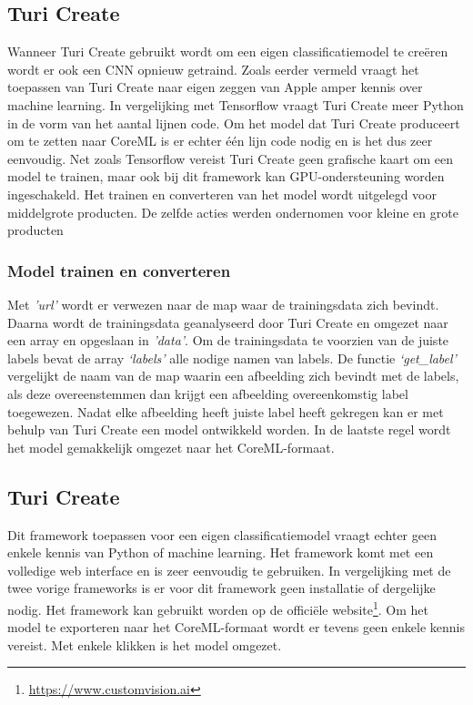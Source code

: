 \subsection{Turi Create}
\label{ssec:Turi Create}

Wanneer Turi Create gebruikt wordt om een eigen classificatiemodel te creëren wordt er ook een \acrshort{CNN} opnieuw getraind. Zoals eerder vermeld vraagt het toepassen van Turi Create naar eigen zeggen van Apple amper kennis over machine learning. In vergelijking met Tensorflow vraagt Turi Create meer Python in de vorm van het aantal lijnen code. Om het model dat Turi Create produceert om te zetten naar CoreML is er echter één lijn code nodig en is het dus zeer eenvoudig. Net zoals Tensorflow vereist Turi Create geen grafische kaart om een model te trainen, maar ook bij dit framework kan \acrshort{GPU}-ondersteuning worden ingeschakeld. Het trainen en converteren van het model wordt uitgelegd voor middelgrote producten. De zelfde acties werden ondernomen voor kleine en grote producten

\newpage
\subsubsection{Model trainen en converteren}
\label{sssec:Model trainen en converteren}


Met \textit{'url'} wordt er verwezen naar de map waar de trainingsdata zich bevindt. Daarna wordt de trainingsdata geanalyseerd door Turi Create en omgezet naar een array en opgeslaan in \textit{'data'}. Om de trainingsdata te voorzien van de juiste labels bevat de array \textit{‘labels’} alle nodige namen van labels. De functie \textit{‘get\_label’} vergelijkt de naam van de map waarin een afbeelding zich bevindt met de labels, als deze overeenstemmen dan krijgt een afbeelding overeenkomstig label toegewezen. Nadat elke afbeelding heeft juiste label heeft gekregen kan er met behulp van Turi Create een model ontwikkeld worden. In de laatste regel wordt het model gemakkelijk omgezet naar het CoreML-formaat.

\subsection{Turi Create}
\label{ssec:Turi Create}

Dit framework toepassen voor een eigen classificatiemodel vraagt echter geen enkele kennis van Python of machine learning. Het framework komt met een volledige web interface en is zeer eenvoudig te gebruiken.
In vergelijking met de twee vorige frameworks is er voor dit framework geen installatie of dergelijke nodig. Het framework kan gebruikt worden op de officiële website\footnote{\url{https://www.customvision.ai}}. Om het model te exporteren naar het CoreML-formaat wordt er tevens geen enkele kennis vereist. Met enkele klikken is het model omgezet. 

